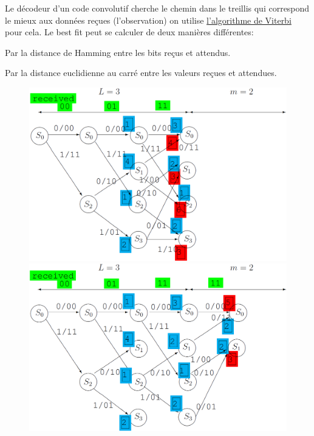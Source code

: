 Le décodeur d'un code convolutif cherche le chemin dans le treillis qui correspond le
mieux aux données reçues (l'observation) on utilise \underline{l'algorithme de Viterbi} pour cela.
Le best fit peut se calculer de deux manières différentes:

Par la distance de Hamming entre les bits reçus et attendus.

Par la distance euclidienne au carré entre les valeurs reçues et attendues.
\begin{figure}[H]
    \begin{minipage}{0.24\textwidth}
        \includegraphics[width=\linewidth]{images/conv_coding_viterbi_1.png}
    \end{minipage}
    \begin{minipage}{0.24\textwidth}
        \includegraphics[width=\linewidth]{images/conv_coding_viterbi_2.png}
    \end{minipage}
\end{figure}
